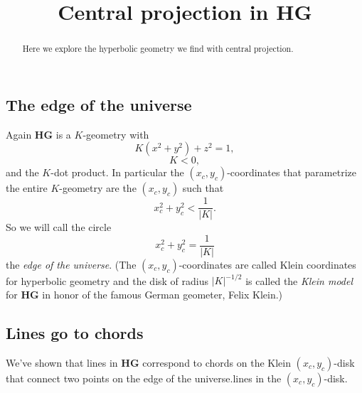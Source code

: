 \documentclass{ximera}
\title{Central projection in HG}
\begin{document}
\begin{abstract}
Here we explore the hyperbolic geometry we find with central projection. 
\end{abstract}
\maketitle


\subsection*{The edge of the universe}

Again \textbf{HG} is a $K$-geometry with
\begin{equation}
K\left(  x^{2}+y^{2}\right)  +z^{2}=1, \label{74}%
\end{equation}
\[
K<0,
\]
and the $K$-dot product. %
In particular %
the $\left( x_{c},y_{c}\right) $-coordinates that parametrize the
entire $K$-geometry are the $\left( x_{c},y_{c}\right) $ such that%
\[
x_{c}^{2}+y_{c}^{2}<\frac{1}{\left\vert K\right\vert }.
\]
So we will call the circle%
\[
x_{c}^{2}+y_{c}^{2}=\frac{1}{\left\vert K\right\vert }%
\]
the \textit{edge of the universe}. (The $\left(  x_{c},y_{c}\right)
$-coordinates are called Klein coordinates for hyperbolic geometry and the
disk of radius $\left\vert K\right\vert ^{-1/2}$ is called the \textit{Klein
model} for \textbf{HG} in honor of the famous German geometer, Felix
Klein.)

\subsection*{Lines go to chords}

We've shown that lines in \textbf{HG} correspond to chords on the
Klein $\left( x_{c},y_{c}\right) $-disk that connect two points on the
edge of the universe.lines in the $\left( x_{c},y_{c}\right) $-disk.
\end{document}
